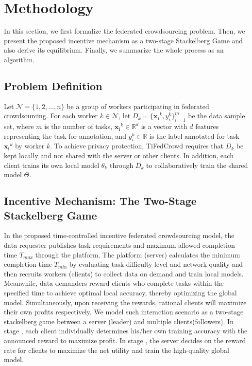 \documentclass[final,1p,times]{elsarticle}
\begin{document}
\section{Methodology} \label{sec:mtd}
In this section, we first formalize the federated crowdsourcing problem. Then, we present the proposed incentive mechanism as a two-stage Stackelberg Game and also derive its equilibrium. Finally, we summarize the whole process as an algorithm.

\subsection{Problem Definition}
Let $\bm{\mathcal{N}} = \{1,2,\dots,n\}$ be a group of workers participating in federated crowdsourcing. For each worker $k\in\bm{\mathcal{N}}$, let $D_k=\{\bm{x_i}^k,y_i^k\}_{i=1}^m$ be the data sample set, where $m$ is the number of tasks, $\bm{x_i}^k\in\mathbb{R}^d$ is a vector with $d$ features representing the task for annotation, and $y_i^k\in\mathbb{R}$ is the label annotated for task $\bm{x_i}^k$ by worker $k$. To achieve privacy protection, TiFedCrowd requires that $D_k$ be kept locally and not shared with the server or other clients. In addition, each client trains its own local model $\theta_k$ through $D_k$ to collaboratively train the shared model $\Theta$.

\subsection{Incentive Mechanism: The Two-Stage Stackelberg Game}
In the proposed time-controlled incentive federated crowdsourcing model, the data requester publishes task requirements and maximum allowed completion time $T_{max}$ through the platform. The platform (server) calculates the minimum completion time $T_{min}$ by evaluating task difficulty level and network quality and then recruits workers (clients) to collect data on demand and train local models. Meanwhile, data demanders reward clients who complete tasks within the specified time to achieve optimal local accuracy, thereby optimizing the global model. Simultaneously, upon receiving the rewards, rational clients will maximize their own profits respectively. We model such interaction scenario as a two-stage stackelberg game between a server (leader) and multiple clients(followers). In stage \uppercase\expandafter{}, each client individually determines his/her own training accuracy with the announced reward to maximize profit. In stage \uppercase\expandafter{}, the server decides on the reward rate for clients to maximize the net utility and train the high-quality global model.
\end{document}
